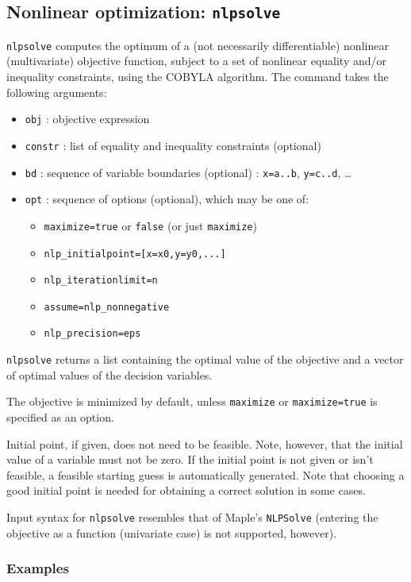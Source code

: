 \documentclass[a4paper,11pt]{book}
\begin{document}
\subsection{Nonlinear optimization: {\tt nlpsolve}}
{\tt nlpsolve} computes the optimum of a (not necessarily differentiable) nonlinear (multivariate) objective function, subject to a set of nonlinear equality and/or inequality constraints, using the COBYLA algorithm. The command takes the following arguments:
\begin{itemize}
	\item {\tt obj} : objective expression
	\item {\tt constr} : list of equality and inequality constraints (optional)
	\item {\tt bd} : sequence of variable boundaries (optional) : {\tt x=a..b}, {\tt y=c..d}, \ldots
	\item {\tt opt} : sequence of options (optional), which may be one of:
	\begin{itemize}
		\item {\tt maximize=true} or {\tt false} (or just {\tt maximize})
		\item {\tt nlp\_initialpoint=[x=x0,y=y0,...]}
		\item {\tt nlp\_iterationlimit=n}
		\item {\tt assume=nlp\_nonnegative}
		\item {\tt nlp\_precision=eps}
	\end{itemize}
\end{itemize}

{\tt nlpsolve} returns a list containing the optimal value of the objective and a vector of optimal values of the decision variables.

The objective is minimized by default, unless {\tt maximize} or {\tt maximize=true} is specified as an option.

Initial point, if given, does not need to be feasible. Note, however, that the initial value of a variable must not be zero. If the initial point is not given or isn't feasible, a feasible starting guess is automatically generated. Note that choosing a good initial point is needed for obtaining a correct solution in some cases.

Input syntax for {\tt nlpsolve} resembles that of Maple's {\tt NLPSolve} (entering the objective as a function (univariate case) is not supported, however).

\subsubsection{Examples}
\end{document}
